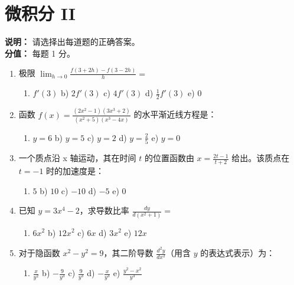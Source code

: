 \documentclass[12pt,a4paper]{article}
\begin{document}
\newpage
\section*{微积分 II}
\textbf{说明：} 请选择出每道题的正确答案。\\
\textbf{分值：} 每题 1 分。

\begin{enumerate}[label=\arabic*), itemsep=15pt, start=16]

    \item 极限 $\lim_{h\rightarrow 0} \frac{f(3+2h)-f(3-2h)}{h} =$
    \begin{enumerate}[label=\alph*), itemsep=0pt]
        \item $f'(3)$ \quad b) $2f'(3)$ \quad c) $4f'(3)$ \quad d) $\frac{1}{2}f'(3)$ \quad e) 0
    \end{enumerate}

    \item 函数 $f(x) = \frac{(2x^2 - 1)(3x^3 + 2)}{(x^2 + 5)(x^3 - 4x)}$ 的水平渐近线方程是：
    \begin{enumerate}[label=\alph*), itemsep=0pt]
        \item $y = 6$ \quad b) $y = 5$ \quad c) $y = 2$ \quad d) $y = \frac{2}{5}$ \quad e) $y = 0$
    \end{enumerate}

    \item 一个质点沿 x 轴运动，其在时间 $t$ 的位置函数由 $x = \frac{2t-1}{t+2}$ 给出。该质点在 $t = -1$ 时的加速度是：
    \begin{enumerate}[label=\alph*), itemsep=0pt]
        \item $5$ \quad b) $10$ \quad c) $-10$ \quad d) $-5$ \quad e) $0$
    \end{enumerate}

    \item 已知 $y = 3x^4 - 2$，求导数比率 $\frac{dy}{d(x^2+1)} =$
    \begin{enumerate}[label=\alph*), itemsep=0pt]
        \item $6x^2$ \quad b) $12x^2$ \quad c) $6x$ \quad d) $3x^2$ \quad e) $12x$
    \end{enumerate}

    \item 对于隐函数 $x^2 - y^2 = 9$，其二阶导数 $\frac{d^2y}{dx^2}$（用含 $y$ 的表达式表示）为：
    \begin{enumerate}[label=\alph*), itemsep=0pt]
        \item $\frac{x}{y^2}$ \quad b) $-\frac{9}{y^3}$ \quad c) $\frac{9}{y^3}$ \quad d) $-\frac{x}{y^3}$ \quad e) $\frac{y^2-x^2}{y^3}$
    \end{enumerate}


\end{enumerate}
\end{document}
